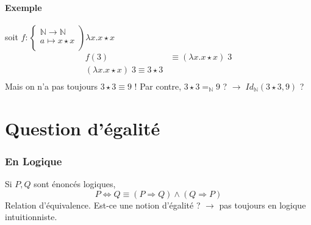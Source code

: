 \documentclass{article}
\newcommand\lterm[2]{\lambda #1. #2}
\newcommand\tlambda[0]{$\lambda$}
\begin{document}
\paragraph{Exemple}
soit $f: \left. \begin{cases}
\mathbb{N}\to \mathbb{N}\\
a \mapsto x\star x\\
\end{cases}\right) \lterm{x}{x\star x}$
\begin{align*}
f(3) & \equiv (\lterm{x}{x\star x})\; 3\\
(\lterm{x}{x\star x}) \; 3 \equiv 3 \star 3\\
\end{align*}
Mais on n'a pas toujours $3 \star 3 \equiv 9$ ! Par contre, $3 \star 3 =_{\mathbb{N}} 9$ ? $\to \; Id_{\mathbb{N}} (3\star 3, 9)$ ?

%
%
%
%
%

\section{Question d'égalité}
\subsubsection*{En Logique}
Si $P,Q$ sont énoncés logiques,
\[P \Leftrightarrow Q \equiv (P\Rightarrow Q) \land (Q \Rightarrow P)\]
Relation d'équivalence. Est-ce une notion d'égalité ? $\to$ pas toujours en logique intuitionniste.
\end{document}
